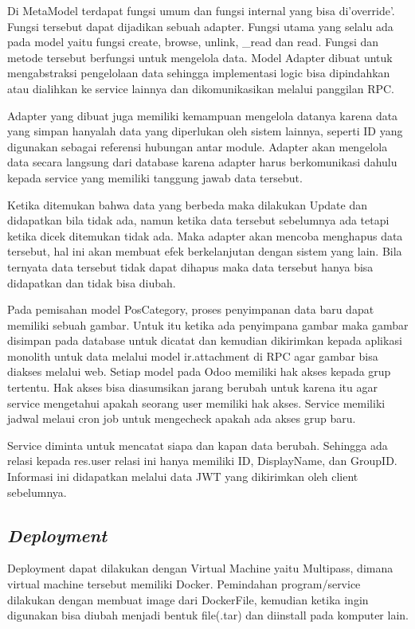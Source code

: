 Di MetaModel terdapat fungsi umum dan fungsi internal yang bisa di'override'. Fungsi tersebut dapat dijadikan sebuah adapter. Fungsi utama yang selalu ada pada model yaitu fungsi create, browse, unlink, \_read dan read. Fungsi dan metode tersebut berfungsi untuk mengelola data. Model Adapter dibuat untuk mengabstraksi pengelolaan data sehingga implementasi logic bisa dipindahkan atau dialihkan ke service lainnya dan dikomunikasikan melalui panggilan RPC.  

Adapter yang dibuat juga memiliki kemampuan mengelola datanya karena data yang simpan hanyalah data yang diperlukan oleh sistem lainnya, seperti ID yang digunakan sebagai referensi hubungan antar module. Adapter akan mengelola data secara langsung dari database karena adapter harus berkomunikasi dahulu kepada service yang memiliki tanggung jawab data tersebut.

Ketika ditemukan bahwa data yang berbeda maka dilakukan Update dan didapatkan bila tidak ada, namun ketika data tersebut sebelumnya ada tetapi ketika dicek ditemukan tidak ada. Maka adapter akan mencoba menghapus data tersebut, hal ini akan membuat efek berkelanjutan dengan sistem yang lain. Bila ternyata data tersebut tidak dapat dihapus maka data tersebut hanya bisa didapatkan dan tidak bisa diubah.

Pada pemisahan  model PosCategory, proses penyimpanan data baru dapat memiliki sebuah gambar. Untuk itu ketika ada penyimpana gambar maka gambar disimpan pada database untuk dicatat dan kemudian dikirimkan kepada aplikasi monolith untuk data melalui model ir.attachment di RPC agar gambar bisa diakses melalui web. Setiap model pada Odoo memiliki hak akses kepada grup tertentu. Hak akses bisa diasumsikan jarang berubah untuk karena itu agar service mengetahui apakah seorang user memiliki hak akses. Service memiliki jadwal melaui cron job untuk mengecheck apakah ada akses grup baru.

Service diminta untuk mencatat siapa dan kapan data berubah. Sehingga ada relasi kepada res.user relasi ini hanya memiliki ID, DisplayName, dan GroupID. Informasi ini didapatkan melalui data JWT yang dikirimkan oleh client sebelumnya.



\subsection{\textit{Deployment}}
Deployment dapat dilakukan dengan Virtual Machine yaitu Multipass, dimana virtual machine tersebut memiliki Docker. Pemindahan program/service dilakukan dengan membuat image dari DockerFile, kemudian ketika ingin digunakan bisa diubah menjadi bentuk file(.tar) dan diinstall pada komputer lain.

